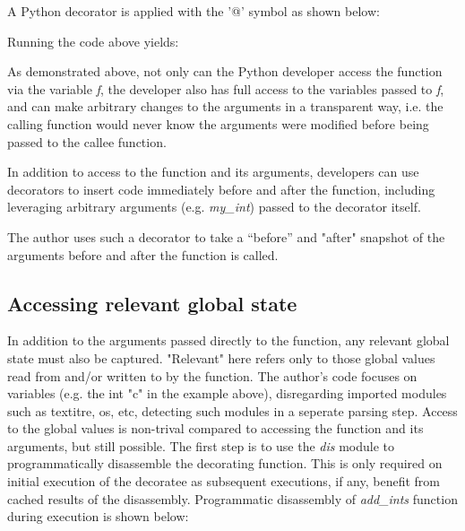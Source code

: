 A Python decorator is applied with the '@' symbol as shown below:


\newpage
Running the code above yields:



As demonstrated above, not only can the Python developer access the function
via the variable \textit{f}, the developer also has full
access to the variables passed to \textit{f}, and can make 
arbitrary changes to the arguments in a transparent way, 
i.e. the calling function would never know the arguments 
were modified before being passed to the callee function.

In addition to access to the function and its arguments,
developers can use decorators to insert code immediately before and after 
the function, including leveraging arbitrary arguments (e.g.
\textit{my\_int}) passed to the decorator itself.

The author uses such a decorator to take a “before” and "after" snapshot of the arguments
before and after the function is called.

%
\subsection{Accessing relevant global state}\label{sec:approach-internal-2}

In addition to the arguments passed directly to the function, any relevant 
global state must also be captured. "Relevant" here refers only to those 
global values read from and/or written to by the function.
The author's code focuses on variables (e.g. the int "c" in the example above), 
disregarding imported modules such as textit{re, os, etc}, detecting such
modules in a seperate parsing step.
Access to the global values is non-trival compared to accessing the function 
and its arguments, but still possible.  The first step is to use the \textit{dis}
module to programmatically disassemble the decorating function.  This is only 
required on initial execution of the decoratee as subsequent executions, if any, 
benefit from cached results of the disassembly.
Programmatic disassembly of \textit{add\_ints} function during execution is shown below:

